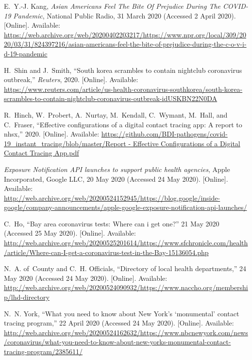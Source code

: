 \documentclass[11pt]{article}
\begin{document}
\begin{thebibliography}{10}
\BIBentryALTinterwordspacing
E.~Y.-J. Kang, \emph{Asian Americans Feel The Bite Of Prejudice During The
  COVID-19 Pandemic}, National Public Radio, 31 March 2020 (Accessed 2 April
  2020). [Online]. Available:
  \url{https://web.archive.org/web/20200402203217/https://www.npr.org/local/309/2020/03/31/824397216/asian-americans-feel-the-bite-of-prejudice-during-the-c-o-v-i-d-19-pandemic}
\BIBentrySTDinterwordspacing

\BIBentryALTinterwordspacing
H.~Shin and J.~Smith, ``South korea scrambles to contain nightclub coronavirus
  outbreak,'' \emph{Reuters}, 2020. [Online]. Available:
  \url{https://www.reuters.com/article/us-health-coronavirus-southkorea/south-korea-scrambles-to-contain-nightclub-coronavirus-outbreak-idUSKBN22N0DA}
\BIBentrySTDinterwordspacing

\BIBentryALTinterwordspacing
R.~Hinch, W.~Probert, A.~Nurtay, M.~Kendall, C.~Wymant, M.~Hall, and C.~Fraser,
  ``Effective configurations of a digital contact tracing app: A report to
  nhsx,'' 2020. [Online]. Available:
  \url{https://github.com/BDI-pathogens/covid-19_instant_tracing/blob/master/Report
  - Effective Configurations of a Digital Contact Tracing App.pdf}
\BIBentrySTDinterwordspacing

\BIBentryALTinterwordspacing
\emph{Exposure Notification API launches to support public health agencies},
  Apple Incorporated, Google LLC, 20 May 2020 (Accessed 24 May 2020). [Online].
  Available:
  \url{http://web.archive.org/web/20200524152945/https://blog.google/inside-google/company-announcements/apple-google-exposure-notification-api-launches/}
\BIBentrySTDinterwordspacing

\BIBentryALTinterwordspacing
C.~Ho, ``Bay area coronavirus tests: Where can i get one?'' 21 May 2020
  (Accessed 25 May 2020). [Online]. Available:
  \url{http://web.archive.org/web/20200525201614/https://www.sfchronicle.com/health/article/Where-can-I-get-a-coronavirus-test-in-the-Bay-15136054.php}
\BIBentrySTDinterwordspacing

\BIBentryALTinterwordspacing
N.~A. of~County and C.~H. Officials, ``Directory of local health departments,''
  24 May 2020 (Accessed 24 May 2020). [Online]. Available:
  \url{http://web.archive.org/web/20200524090932/https://www.naccho.org/membership/lhd-directory}
\BIBentrySTDinterwordspacing

\BIBentryALTinterwordspacing
N.~N. York, ``What you need to know about {N}ew {Y}ork’s ‘monumental’
  contact tracing program,'' 22 April 2020 (Accessed 24 May 2020). [Online].
  Available:
  \url{http://web.archive.org/web/20200524162632/https://www.nbcnewyork.com/news/coronavirus/what-you-need-to-know-about-new-yorks-monumental-contact-tracing-program/2385611/}
\BIBentrySTDinterwordspacing

\end{thebibliography}
\end{document}
